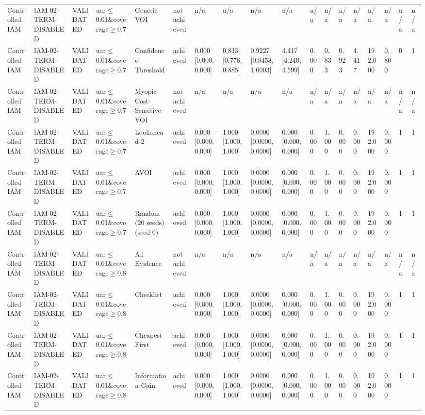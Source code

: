 \begin{table}[!ht]
{\begin{tabular}{llllllllllllllllll}
Controlled IAM & IAM-02-TERM-DISABLED & VALIDATED & uar$\le$0.01\&coverage$\ge$0.7 & Generic VOI & not achieved & n/a & n/a & n/a & n/a & n/a & n/a & n/a & n/a & n/a & n/a & n/a & n/a \\
Controlled IAM & IAM-02-TERM-DISABLED & VALIDATED & uar$\le$0.01\&coverage$\ge$0.7 & Confidence Threshold & achieved & 0.000 [0.000, 0.000] & 0.833 [0.776, 0.885] & 0.9227 [0.8458, 1.0003] & 4.417 [4.240, 4.599] & 0.000 & 0.833 & 0.923 & 4.417 & 192.000 & 0.800 & 0 & 1 \\
Controlled IAM & IAM-02-TERM-DISABLED & VALIDATED & uar$\le$0.01\&coverage$\ge$0.7 & Myopic Cost-Sensitive VOI & not achieved & n/a & n/a & n/a & n/a & n/a & n/a & n/a & n/a & n/a & n/a & n/a & n/a \\
Controlled IAM & IAM-02-TERM-DISABLED & VALIDATED & uar$\le$0.01\&coverage$\ge$0.7 & Lookahead-2 & achieved & 0.000 [0.000, 0.000] & 1.000 [1.000, 1.000] & 0.0000 [0.0000, 0.0000] & 0.000 [0.000, 0.000] & 0.000 & 1.000 & 0.000 & 0.000 & 192.000 & 0.000 & 1 & 1 \\
Controlled IAM & IAM-02-TERM-DISABLED & VALIDATED & uar$\le$0.01\&coverage$\ge$0.7 & AVOI & achieved & 0.000 [0.000, 0.000] & 1.000 [1.000, 1.000] & 0.0000 [0.0000, 0.0000] & 0.000 [0.000, 0.000] & 0.000 & 1.000 & 0.000 & 0.000 & 192.000 & 0.000 & 1 & 1 \\
Controlled IAM & IAM-02-TERM-DISABLED & VALIDATED & uar$\le$0.01\&coverage$\ge$0.7 & Random (20 seeds) (seed 0) & achieved & 0.000 [0.000, 0.000] & 1.000 [1.000, 1.000] & 0.0000 [0.0000, 0.0000] & 0.000 [0.000, 0.000] & 0.000 & 1.000 & 0.000 & 0.000 & 192.000 & 0.000 & 1 & 1 \\
Controlled IAM & IAM-02-TERM-DISABLED & VALIDATED & uar$\le$0.01\&coverage$\ge$0.8 & All Evidence & not achieved & n/a & n/a & n/a & n/a & n/a & n/a & n/a & n/a & n/a & n/a & n/a & n/a \\
Controlled IAM & IAM-02-TERM-DISABLED & VALIDATED & uar$\le$0.01\&coverage$\ge$0.8 & Checklist & achieved & 0.000 [0.000, 0.000] & 1.000 [1.000, 1.000] & 0.0000 [0.0000, 0.0000] & 0.000 [0.000, 0.000] & 0.000 & 1.000 & 0.000 & 0.000 & 192.000 & 0.000 & 1 & 1 \\
Controlled IAM & IAM-02-TERM-DISABLED & VALIDATED & uar$\le$0.01\&coverage$\ge$0.8 & Cheapest First & achieved & 0.000 [0.000, 0.000] & 1.000 [1.000, 1.000] & 0.0000 [0.0000, 0.0000] & 0.000 [0.000, 0.000] & 0.000 & 1.000 & 0.000 & 0.000 & 192.000 & 0.000 & 1 & 1 \\
Controlled IAM & IAM-02-TERM-DISABLED & VALIDATED & uar$\le$0.01\&coverage$\ge$0.8 & Information Gain & achieved & 0.000 [0.000, 0.000] & 1.000 [1.000, 1.000] & 0.0000 [0.0000, 0.0000] & 0.000 [0.000, 0.000] & 0.000 & 1.000 & 0.000 & 0.000 & 192.000 & 0.000 & 1 & 1 \\

\end{tabular}}
\end{table}
